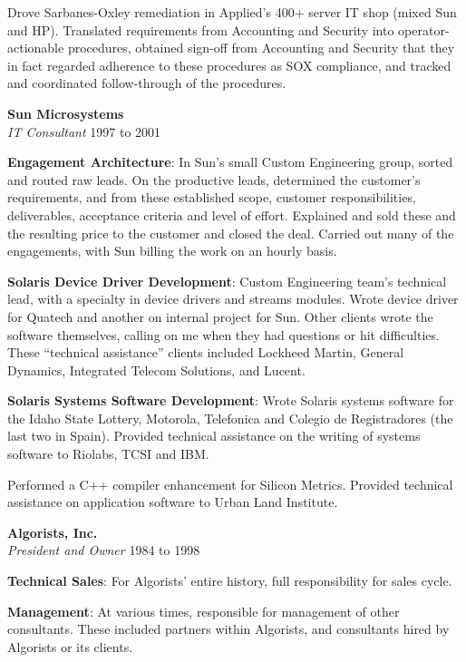 \documentclass[12pt,margin,line]{res}
\newcommand{\internalskip}{\vspace{-.15in}}
\begin{document}
\begin{resume}
\internalskip
Drove Sarbanes-Oxley remediation in Applied's 400+ server IT shop
(mixed Sun and HP).
Translated requirements from Accounting and Security into operator-actionable
procedures, obtained sign-off from Accounting and Security that they in
fact regarded adherence to these procedures as SOX compliance, and tracked
and coordinated follow-through of the procedures.

{\bf Sun Microsystems} \\
{\em IT Consultant} \hfill 1997 to 2001

\internalskip
{\bf\footnotesize Engagement Architecture}:
In Sun's small Custom Engineering group, sorted and routed raw leads.
On the productive leads, determined the customer's requirements, and from
these established scope, customer responsibilities, deliverables, acceptance
criteria and level of effort.
Explained and sold these and the resulting price to the customer and closed
the deal.
Carried out many of the engagements, with Sun billing the work on an hourly
basis.

\internalskip
{\bf\footnotesize Solaris Device Driver Development}:
Custom Engineering team's technical lead, with a specialty in device drivers
and streams modules.
Wrote device driver for Quatech and another on internal project for Sun.
Other clients wrote the software themselves, calling on me when they had
questions or hit difficulties.
These ``technical assistance''
clients included Lockheed Martin, General Dynamics, Integrated Telecom
Solutions, and Lucent.

\internalskip
{\footnotesize\bf Solaris Systems Software Development}:
Wrote Solaris systems software for the Idaho State Lottery, Motorola,
Telefonica and Colegio de Registradores (the last two in Spain).
Provided technical assistance on the writing of systems software to Riolabs,
TCSI and IBM.

\internalskip
Performed a C++ compiler enhancement for Silicon Metrics.
Provided technical assistance on application software to Urban Land Institute.

{\bf Algorists, Inc.} \\
{\em President and Owner} \hfill 1984 to 1998

\internalskip
{\footnotesize\bf Technical Sales}:
For Algorists' entire history, full responsibility for sales cycle.

\internalskip
{\footnotesize\bf Management}:
At various times, responsible for management of other consultants.
These included partners within Algorists, and consultants hired by Algorists
or its clients.


\end{resume}
\end{document}
